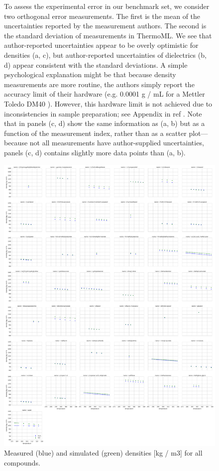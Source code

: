 \documentclass[journal=jacsat,manuscript=article]{achemso}
\begin{document}
\begin{figure}
\caption{To assess the experimental error in our benchmark set, we consider two orthogonal error measurements.  The first is the mean of the uncertainties reported by the measurement authors.  The second is the standard deviation of measurements in ThermoML.   We see that author-reported uncertainties appear to be overly optimistic for densities (a, c), but author-reported uncertainties of dielectrics (b, d) appear consistent with the standard deviations.  A simple psychological explanation might be that because density measurements are more routine, the authors simply report the accuracy limit of their hardware (e.g. 0.0001 g / mL for a Mettler Toledo DM40 \cite{mettlertoledo}).  However, this hardware limit is not achieved due to inconsistencies in sample preparation; see Appendix in ref \cite{chirico2013improvement}.  Note that in panels (c, d) show the same information as (a, b) but as a function of the measurement index, rather than as a scatter plot---because not all measurements have author-supplied uncertainties, panels (c, d) contains slightly more data points than (a, b).  
}
\label{figure:ErrorAnalysis}

\end{figure}


\begin{figure}

\includegraphics[width=\columnwidth]{./figures/densities_versus_temperature_all.pdf}

\caption{Measured (blue) and simulated (green) densities [kg / m3] for all compounds.
}
\label{figure:AllDensities}

\end{figure}
\end{document}

